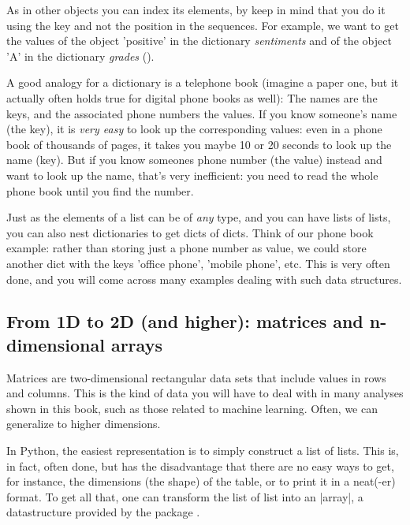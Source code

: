 
As in other objects you can index its elements, by keep in mind that
you do it using the key and not the position in the sequences. For
example, we want to get the values of the object 'positive' in the
dictionary \emph{sentiments} and of the object 'A' in the dictionary
\emph{grades} ().

A good analogy for a dictionary is a telephone book (imagine a paper
one, but it actually often holds true for digital phone books as
well): The names are the keys, and the associated phone numbers the
values. If you know someone's name (the key), it is \emph{very easy}
to look up the corresponding values: even in a phone book of thousands
of pages, it takes you maybe 10 or 20 seconds to look up the name
(key). But if you know someones phone number (the value) instead and
want to look up the name, that's very inefficient: you need to read
the whole phone book until you find the number.

Just as the elements of a list can be of \emph{any} type, and you can
have lists of lists, you can also nest dictionaries to get dicts of
dicts. Think of our phone book example: rather than storing just a
phone number as value, we could store another dict with the keys
'office phone', 'mobile phone', etc. This is very often done, and you
will come across many examples dealing with such data structures.




\subsection{From 1D to 2D (and higher): matrices and n-dimensional arrays}

Matrices are two-dimensional rectangular data sets that include values
in rows and columns. This is the kind of data you will have to deal
with in many analyses shown in this book, such as those related to
machine learning. Often, we can generalize to higher dimensions.


In Python, the easiest representation is to simply construct a list of
lists. This is, in fact, often done, but has the disadvantage that
there are no easy ways to get, for instance, the dimensions (the
shape) of the table, or to print it in a neat(-er) format. To get all
that, one can transform the list of list into an |array|, a
datastructure provided by the package .

